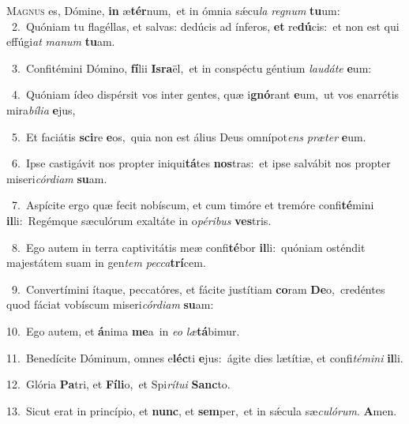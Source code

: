 \lettrine{\initial\textcolor{\initialcolor}{M}}{agnus} es, Dómine, \textbf{in} æ\-\textbf{tér}\-num,~\star et in ómnia sǽcu\textit{la} \textit{re}\-\textit{gnum} \textbf{tu}\-um:\\
{\numbfont\textcolor{\numbcolor}{~2.}}~Quóniam tu flagéllas, et salvas: dedúcis ad ínferos, \textbf{et} re\-\textbf{dú}\-cis:~\star et non est qui effúgi\textit{at} \textit{ma}\-\textit{num} \textbf{tu}\-am.\par
{\numbfont\textcolor{\numbcolor}{~3.}}~Confitémini Dómino, \textbf{fí}\-lii \textbf{Is}\-\textbf{ra}ël,~\star et in conspéctu géntium \textit{lau}\-\textit{dá}\textit{te} \textbf{e}\-um:\par
{\numbfont\textcolor{\numbcolor}{~4.}}~Quóniam ídeo dispérsit vos inter gentes, quæ i\-\textbf{gnó}\-rant \textbf{e}\-um,~\star ut vos enarrétis mira\-\textit{bí}\-\textit{li}\textit{a} \textbf{e}\-jus,\par
{\numbfont\textcolor{\numbcolor}{~5.}}~Et faciátis \textbf{sci}\-re \textbf{e}\-os,~\star quia non est álius Deus omnípot\textit{ens} \textit{præ}\-\textit{ter} \textbf{e}\-um.\par
{\numbfont\textcolor{\numbcolor}{~6.}}~Ipse castigávit nos propter iniqui\-\textbf{tá}\-tes \textbf{nos}\-tras:~\star et ipse salvábit nos propter miseri\-\textit{cór}\-\textit{di}\textit{am} \textbf{su}\-am.\par
{\numbfont\textcolor{\numbcolor}{~7.}}~Aspícite ergo quæ fecit nobíscum, et cum timóre et tremóre confi\-\textbf{té}\-mini \textbf{il}\-li:~\star Regémque sæculórum exaltáte in o\-\textit{pé}\-\textit{ri}\textit{bus} \textbf{ves}\-tris.\par
{\numbfont\textcolor{\numbcolor}{~8.}}~Ego autem in terra captivitátis meæ confi\-\textbf{té}\-bor \textbf{il}\-li:~\star quóniam osténdit majestátem suam in gen\textit{tem} \textit{pec}\-\textit{ca}\textbf{trí}cem.\par
{\numbfont\textcolor{\numbcolor}{~9.}}~Convertímini ítaque, peccatóres, et fácite justítiam \textbf{co}\-ram \textbf{De}\-o,~\star credéntes quod fáciat vobíscum miseri\-\textit{cór}\-\textit{di}\textit{am} \textbf{su}\-am:\par
{\numbfont\textcolor{\numbcolor}{10.}}~Ego autem, et \textbf{á}\-nima \textbf{me}\-a~\star in \textit{e}\-\textit{o} \textit{læ}\-\textbf{tá}bimur.\par
{\numbfont\textcolor{\numbcolor}{11.}}~Benedícite Dóminum, omnes e\-\textbf{léc}\-ti \textbf{e}\-jus:~\star ágite dies lætítiæ, et confi\-\textit{té}\-\textit{mi}\textit{ni} \textbf{il}\-li.\par
{\numbfont\textcolor{\numbcolor}{12.}}~Glória \textbf{Pa}\-tri, et \textbf{Fí}\-\textbf{li}o,~\star et Spi\-\textit{rí}\-\textit{tu}\textit{i} \textbf{Sanc}\-to.\par
{\numbfont\textcolor{\numbcolor}{13.}}~Sicut erat in princípio, et \textbf{nunc}\-, et \textbf{sem}\-per,~\star et in sǽcula sæ\-\textit{cu}\-\textit{ló}\textit{rum}. \textbf{A}\-men.\par
